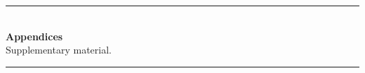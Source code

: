 \documentclass{article}
\begin{document}


\appendix
\newpage
\begin{center}
  \rule{0.5\linewidth}{0.4pt}\\[0.6em]
  {\Large\bfseries Appendices}\\[0.25em]
  {\small Supplementary material.}\\[0.4em]
  \rule{0.5\linewidth}{0.4pt}
\end{center}
\vspace{0.5em}








\end{document}
